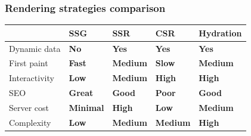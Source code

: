 \documentclass{beamer}
\begin{document}
\newcommand{\colGood}[1]{\textbf{\textcolor{green!60!black}{#1}}}
\newcommand{\colMid}[1]{\textbf{\textcolor{orange!80!black}{#1}}}
\newcommand{\colBad}[1]{\textbf{\textcolor{red!70!black}{#1}}}

\begin{frame}

  \frametitle{Rendering strategies comparison}

  \begin{tabularx}{\textwidth}{l X X X X}
    \hline
    & \textbf{SSG} & \textbf{SSR} & \textbf{CSR} & \textbf{Hydration} \\
    \hline
    Dynamic data   & \colBad{No}       & \colGood{Yes}     & \colGood{Yes}     & \colGood{Yes}   \\
    First paint    & \colGood{Fast}    & \colMid{Medium}   & \colBad{Slow}     & \colMid{Medium} \\
    Interactivity  & \colBad{Low}      & \colMid{Medium}   & \colGood{High}    & \colGood{High}  \\
    SEO            & \colGood{Great}   & \colGood{Good}    & \colBad{Poor}     & \colGood{Good}  \\
    Server cost    & \colGood{Minimal} & \colBad{High}     & \colGood{Low}     & \colMid{Medium} \\
    Complexity     & \colGood{Low}     & \colMid{Medium}   & \colMid{Medium}   & \colBad{High}   \\
    \hline
  \end{tabularx}

\end{frame}
\end{document}
